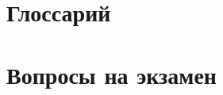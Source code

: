 \documentclass[
    14pt,
    a4paper,
    oneside,
    openany,
    draft
]{extreport}
\begin{document}





%

%

%

%

%

%




\chapter{Глоссарий}

\chapter{Вопросы на экзамен}



%
\printbibliography[heading=bibintoc]

\end{document}
